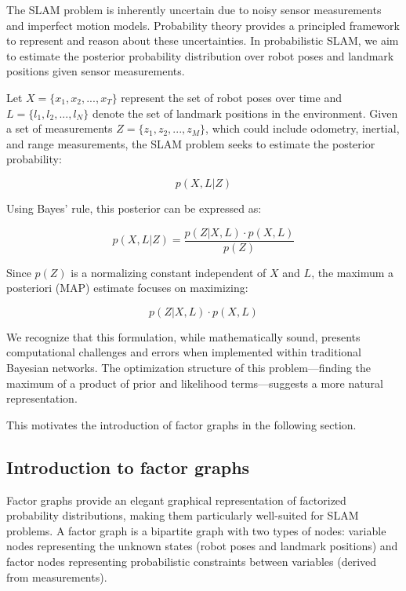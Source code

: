 \documentclass[journal]{IEEEtran}
\begin{document}
The SLAM problem is inherently uncertain due to noisy sensor measurements and imperfect motion models. Probability theory provides a principled framework to represent and reason about these uncertainties. In probabilistic SLAM, we aim to estimate the posterior probability distribution over robot poses and landmark positions given sensor measurements.

Let $X = \{x_1, x_2, ..., x_T\}$ represent the set of robot poses over time and $L = \{l_1, l_2, ..., l_N\}$ denote the set of landmark positions in the environment. Given a set of measurements $Z = \{z_1, z_2, ..., z_M\}$, which could include odometry, inertial, and range measurements, the SLAM problem seeks to estimate the posterior probability:

\begin{equation}
    p(X, L | Z)
\end{equation}

Using Bayes' rule, this posterior can be expressed as:

\begin{equation}
    p(X, L | Z) = \frac{p(Z | X, L) \cdot p(X, L)}{p(Z)}
\end{equation}

Since $p(Z)$ is a normalizing constant independent of $X$ and $L$, the maximum a posteriori (MAP) estimate focuses on maximizing:

\begin{equation}
    p(Z | X, L) \cdot p(X, L)
\end{equation}

We recognize that this formulation, while mathematically sound, presents computational challenges and errors when implemented within traditional Bayesian networks. The optimization structure of this problem—finding the maximum of a product of prior and likelihood terms—suggests a more natural representation.

This motivates the introduction of factor graphs in the following section.

\subsection{Introduction to factor graphs}

Factor graphs provide an elegant graphical representation of factorized probability distributions, making them particularly well-suited for SLAM problems. A factor graph is a bipartite graph with two types of nodes: variable nodes representing the unknown states (robot poses and landmark positions) and factor nodes representing probabilistic constraints between variables (derived from measurements).
\end{document}
